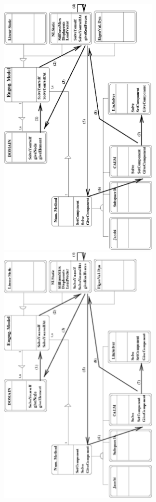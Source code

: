 \documentclass[a4paper]{article}
\begin{document}
\begin{figure}[tb]
\begin{htmlonly}
  \centerline{\includegraphics[width=0.7\textwidth]{struct2.eps}}
\end{htmlonly}
\ifpdf
\centerline{\includegraphics[angle=270,width=0.7\textwidth]{struct2.pdf}}

\end{figure}
\end{document}
